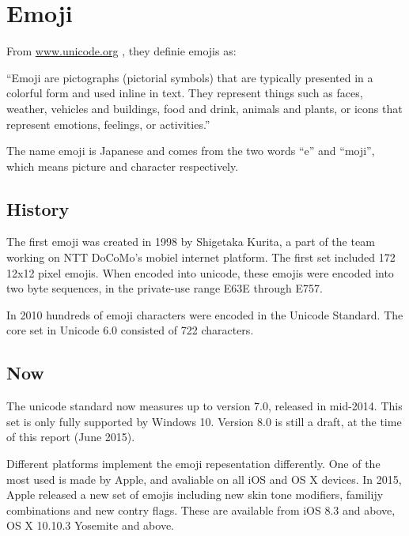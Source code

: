 \documentclass[a4paper]{article}
\begin{document}

\section{Emoji} %
\label{sec:emoji}

From \url{www.unicode.org} \cite{ emoji:1}, they definie emojis as:

``Emoji are pictographs (pictorial symbols) that are typically presented in a colorful form and used inline in text. They represent things such as faces, weather, vehicles and buildings, food and drink, animals and plants, or icons that represent emotions, feelings, or activities.''

The name emoji is Japanese and comes from the two words ``e'' and ``moji'', which means picture and character respectively.

\subsection{History} %
\label{sub:history}

The first emoji was created in 1998 by Shigetaka Kurita, a part of the team working on NTT DoCoMo's mobiel internet platform. The first set included 172 12x12 pixel emojis. When encoded into unicode, these emojis were encoded into two byte sequences, in the private-use range E63E through E757. \cite{ wiki:1}

In 2010 hundreds of emoji characters were encoded in the Unicode Standard. The core set in Unicode 6.0 consisted of 722 characters.


\subsection{Now} %
\label{sub:now}

The unicode standard now measures up to version 7.0, released in mid-2014. This set is only fully supported by Windows 10. Version 8.0 is still a draft, at the time of this report (June 2015).

Different platforms implement the emoji repesentation differently. One of the most used is made by Apple, and avaliable on all iOS and OS X devices. In 2015, Apple released a new set of emojis including new skin tone modifiers, familijy combinations and new contry flags. These are available from iOS 8.3 and above, OS X 10.10.3 Yosemite and above.
\end{document}
